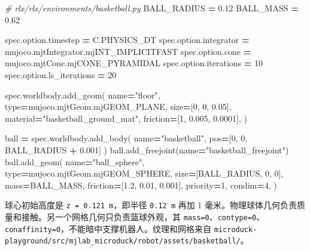 \documentclass[
  chinese,
  11pt,
  letterpaper,
]{article}
\newenvironment{Shaded}{\begin{snugshade}}{\end{snugshade}}
\newcommand{\BuiltInTok}[1]{#1}
\newcommand{\CommentTok}[1]{\textcolor[rgb]{0.56,0.35,0.01}{\textit{#1}}}
\newcommand{\DecValTok}[1]{\textcolor[rgb]{0.00,0.00,0.81}{#1}}
\newcommand{\FloatTok}[1]{\textcolor[rgb]{0.00,0.00,0.81}{#1}}
\newcommand{\NormalTok}[1]{#1}
\newcommand{\OperatorTok}[1]{\textcolor[rgb]{0.81,0.36,0.00}{\textbf{#1}}}
\newcommand{\StringTok}[1]{\textcolor[rgb]{0.31,0.60,0.02}{#1}}
\renewenvironment{Shaded}{\par\smallskip}{\par\smallskip}
\begin{document}
\begin{Shaded}
\begin{Highlighting}[]
\CommentTok{\# rlx/rlx/environments/basketball.py}
\NormalTok{BALL\_RADIUS }\OperatorTok{=} \FloatTok{0.12}
\NormalTok{BALL\_MASS }\OperatorTok{=} \FloatTok{0.62}

\NormalTok{spec.option.timestep }\OperatorTok{=}\NormalTok{ C.PHYSICS\_DT}
\NormalTok{spec.option.integrator }\OperatorTok{=}\NormalTok{ mujoco.mjtIntegrator.mjINT\_IMPLICITFAST}
\NormalTok{spec.option.cone }\OperatorTok{=}\NormalTok{ mujoco.mjtCone.mjCONE\_PYRAMIDAL}
\NormalTok{spec.option.iterations }\OperatorTok{=} \DecValTok{10}
\NormalTok{spec.option.ls\_iterations }\OperatorTok{=} \DecValTok{20}

\NormalTok{spec.worldbody.add\_geom(}
\NormalTok{    name}\OperatorTok{=}\StringTok{"floor"}\NormalTok{, }\BuiltInTok{type}\OperatorTok{=}\NormalTok{mujoco.mjtGeom.mjGEOM\_PLANE,}
\NormalTok{    size}\OperatorTok{=}\NormalTok{[}\DecValTok{0}\NormalTok{, }\DecValTok{0}\NormalTok{, }\FloatTok{0.05}\NormalTok{], material}\OperatorTok{=}\StringTok{"basketball\_ground\_mat"}\NormalTok{,}
\NormalTok{    friction}\OperatorTok{=}\NormalTok{[}\DecValTok{1}\NormalTok{, }\FloatTok{0.005}\NormalTok{, }\FloatTok{0.0001}\NormalTok{],}
\NormalTok{)}

\NormalTok{ball }\OperatorTok{=}\NormalTok{ spec.worldbody.add\_body(}
\NormalTok{    name}\OperatorTok{=}\StringTok{"basketball"}\NormalTok{, pos}\OperatorTok{=}\NormalTok{[}\DecValTok{0}\NormalTok{, }\DecValTok{0}\NormalTok{, BALL\_RADIUS }\OperatorTok{+} \FloatTok{0.001}\NormalTok{]}
\NormalTok{)}
\NormalTok{ball.add\_freejoint(name}\OperatorTok{=}\StringTok{"basketball\_freejoint"}\NormalTok{)}
\NormalTok{ball.add\_geom(}
\NormalTok{    name}\OperatorTok{=}\StringTok{"ball\_sphere"}\NormalTok{, }\BuiltInTok{type}\OperatorTok{=}\NormalTok{mujoco.mjtGeom.mjGEOM\_SPHERE,}
\NormalTok{    size}\OperatorTok{=}\NormalTok{[BALL\_RADIUS, }\DecValTok{0}\NormalTok{, }\DecValTok{0}\NormalTok{], mass}\OperatorTok{=}\NormalTok{BALL\_MASS,}
\NormalTok{    friction}\OperatorTok{=}\NormalTok{[}\FloatTok{1.2}\NormalTok{, }\FloatTok{0.01}\NormalTok{, }\FloatTok{0.001}\NormalTok{], priority}\OperatorTok{=}\DecValTok{1}\NormalTok{, condim}\OperatorTok{=}\DecValTok{4}\NormalTok{,}
\NormalTok{)}
\end{Highlighting}
\end{Shaded}

球心初始高度是 \texttt{z\ =\ 0.121\ m}，即半径 \texttt{0.12\ m} 再加 1
毫米。物理球体几何负责质量和接触。另一个网格几何只负责篮球外观，其
\texttt{mass=0}、\texttt{contype=0}、\texttt{conaffinity=0}，不能暗中支撑机器人。纹理和网格来自
\texttt{microduc\allowbreak{}k-\allowbreak{}playgrou\allowbreak{}nd/\allowbreak{}src/\allowbreak{}mjlab\_\allowbreak{}microduc\allowbreak{}k/\allowbreak{}robot/\allowbreak{}assets/\allowbreak{}basketba\allowbreak{}ll/\allowbreak{}}。
\end{document}
